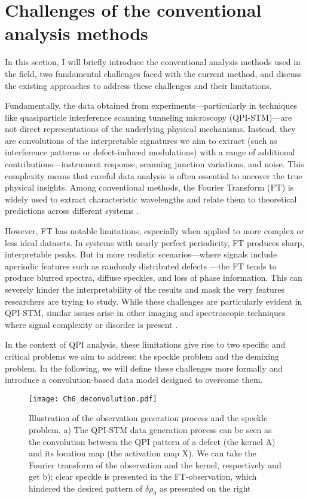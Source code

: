 \section{Challenges of the conventional analysis methods}
In this section, I will briefly introduce the conventional analysis methods used in the field, two fundamental challenges faced with the current method, and discuss the existing approaches to address these challenges and their limitations. 

Fundamentally, the data obtained from experiments—particularly in techniques like quasiparticle interference scanning tunneling microscopy (QPI-STM)—are not direct representations of the underlying physical mechanisms. Instead, they are convolutions of the interpretable signatures we aim to extract (such as interference patterns or defect-induced modulations) with a range of additional contributions—instrument response, scanning junction variations, and noise. This complexity means that careful data analysis is often essential to uncover the true physical insights. Among conventional methods, the Fourier Transform (FT) is widely used to extract characteristic wavelengths and relate them to theoretical predictions across different systems \cite{ardiniHighthroughputMultimodalWidefield2023}\cite{jaffeDifferenceFourierAnalysis1987}
\noindent \cite{sciuttoFTNIRMicroscopyAdvanced2014}\cite{kimotoAssessmentLowervoltageTEM2012}.

However, FT has notable limitations, especially when applied to more complex or less ideal datasets. In systems with nearly perfect periodicity, FT produces sharp, interpretable peaks. But in more realistic scenarios—where signals include aperiodic features such as randomly distributed defects —the FT tends to produce blurred spectra, diffuse speckles, and loss of phase information. This can severely hinder the interpretability of the results and mask the very features researchers are trying to study. While these challenges are particularly evident in QPI-STM, similar issues arise in other imaging and spectroscopic techniques where signal complexity or disorder is present\cite{Bonnet 1997} \cite{Draijer 2009}.

In the context of QPI analysis, these limitations give rise to two specific and critical problems we aim to address: the speckle problem and the demixing problem. In the following, we will define these challenges more formally and introduce a convolution-based data model designed to overcome them.
\begin{figure}
	\texttt{[image: Ch6\_deconvolution.pdf]} 
	\centering
	\caption{Illustration of the observation generation process and the speckle problem. a) The QPI-STM data generation process can be seen as the convolution between the QPI pattern of a defect (the kernel A) and its location map (the activation map X). We can take the Fourier transform of the observation and the kernel, respectively and get b); clear speckle is presented in the FT-observation, which hindered the desired pattern of $\delta\rho_0$ as presented on the right}
	\label{fig:ch6_decon}
\end{figure}

